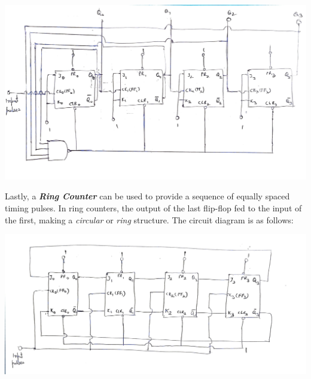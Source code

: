 \begin{center}
    \includegraphics[scale = 0.2]{Figures/mod12_1.jpg}
\end{center}
Lastly, a \textbf{\emph{Ring Counter}} can be used to provide a sequence of equally spaced timing pulses. In ring counters, the output of the last flip-flop fed to the input of the first, making a \emph{circular} or \emph{ring} structure. The circuit diagram is as follows:
\begin{center}
    \includegraphics[scale = 0.2]{Figures/1617014472077.jpg}
\end{center}
